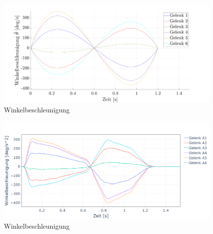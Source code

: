 %
\newpage
\begin{figure}[]
	\centering
	\includegraphics[width=1\linewidth]{images/winkelbeschleunigung}
	\caption{Winkelbeschleunigung}
	\label{fig:winkelbeschleunigung}
\end{figure}
%
\begin{figure}[]
	\centering
	\includegraphics[width=1\linewidth]{images/winkelbeschleunigung_py1}
	\caption{Winkelbeschleunigung}
	\label{fig:winkelbeschleunigung_py}
\end{figure}
